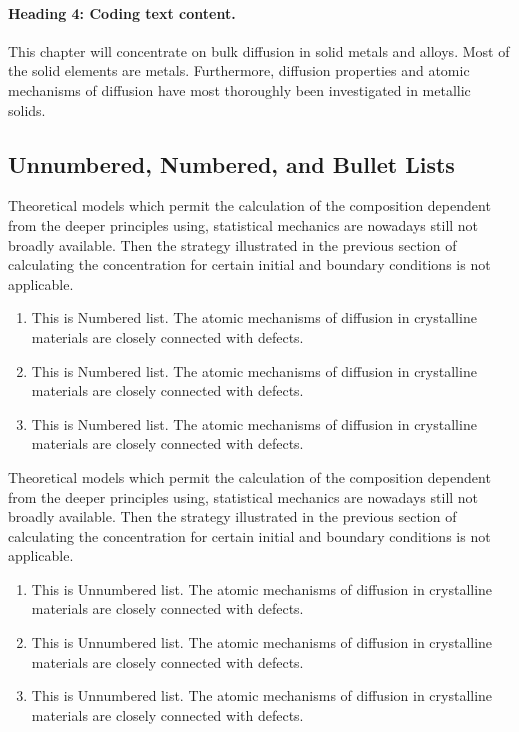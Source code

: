 \documentclass[cmbright]{WileySTAT-V1} %
\theoremstyle{plain}
\begin{document}
\paragraph{Heading 4: Coding text content.}
This chapter will concentrate on bulk diffusion in solid metals and alloys. Most of the solid elements are metals. Furthermore, diffusion properties and atomic mechanisms of diffusion have most thoroughly been investigated in metallic solids.

\subsection{Unnumbered, Numbered, and Bullet Lists}\label{sec4.2}
Theoretical models which permit the calculation of the composition dependent from the deeper principles using, statistical mechanics are nowadays still not broadly available. Then the strategy illustrated in the previous section of calculating the concentration for certain initial and boundary conditions is not applicable.%
\begin{enumerate} %
\item This is Numbered list. The atomic mechanisms of diffusion in crystalline materials are closely connected with defects.
\item This is Numbered list. The atomic mechanisms of diffusion in crystalline materials are closely connected with defects.
\item This is Numbered list. The atomic mechanisms of diffusion in crystalline materials are closely connected with defects.
\end{enumerate}
Theoretical models which permit the calculation of the composition dependent from the deeper principles using, statistical mechanics are nowadays still not broadly available. Then the strategy illustrated in the previous section of calculating the concentration for certain initial and boundary conditions is not applicable.%
\begin{enumerate} %
\item This is Unnumbered list. The atomic mechanisms of diffusion in crystalline materials are closely connected with defects.
\item This is Unnumbered list. The atomic mechanisms of diffusion in crystalline materials are closely connected with defects.
\item This is Unnumbered list. The atomic mechanisms of diffusion in crystalline materials are closely connected with defects.
\end{enumerate}
\end{document}
